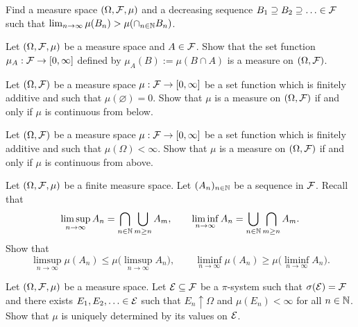 \begin{problem}
Find a measure space $(\Omega,\mathcal F,\mu)$ and a decreasing sequence $B_1\supseteq B_2\supseteq\ldots \in \mathcal F$ such that $\lim_{n\to\infty}\mu(B_n) > \mu(\cap_{n\in \mathbb N} B_n)$.    
\end{problem}

\begin{problem}
    Let $(\Omega,\mathcal F,\mu)$ be a measure space and $A\in \mathcal F$. Show that the set function $\mu_A:\mathcal F\to[0,\infty]$ defined by $\mu_A(B):=\mu(B\cap A)$ is a measure on $(\Omega,\mathcal F)$.  
\end{problem}

\begin{problem}
    Let $(\Omega,\mathcal F)$ be a measure space $\mu:\mathcal F\to[0,\infty]$ be a set function which is finitely additive and such that $\mu(\varnothing)=0$. Show that $\mu$ is a measure on $(\Omega,\mathcal F)$ if and only if $\mu$ is continuous from below. 
\end{problem}

\begin{problem}
    Let $(\Omega,\mathcal F)$ be a measure space $\mu:\mathcal F\to[0,\infty]$ be a set function which is finitely additive and such that $\mu(\Omega)<\infty$. Show that $\mu$ is a measure on $(\Omega,\mathcal F)$ if and only if $\mu$ is continuous from above. 
\end{problem}


\begin{problem}
    Let $(\Omega,\mathcal F,\mu)$ be a finite measure space. Let $(A_n)_{n\in \mathbb N}$ be a sequence in $\mathcal F$. Recall that 
    \begin{equation*}
        \limsup_{n\to\infty} A_n = \bigcap_{n\in \mathbb N} \bigcup_{m\geq n} A_m,\qquad \liminf_{n\to\infty} A_n = \bigcup_{n\in \mathbb N} \bigcap_{m\geq n} A_m.
    \end{equation*} 
    Show that
    \begin{equation*}
        \limsup_{n\to\infty} \mu(A_n) \leq  \mu \Big(\limsup_{n\to\infty} A_n\Big),\qquad \liminf_{n\to\infty} \mu(A_n) \geq  \mu \Big(\liminf_{n\to\infty} A_n\Big).
    \end{equation*}
\end{problem}

\begin{problem}
    Let $(\Omega,\mathcal F,\mu)$ be a measure space. Let $\mathcal E\subseteq \mathcal F$ be a $\pi$-system such that $\sigma(\mathcal E) = \mathcal F$ and there exists $E_1,E_2,\ldots \in \mathcal E$ such that $E_n\uparrow \Omega$ and $\mu(E_n)<\infty$ for all $n\in \mathbb N$. Show that $\mu$ is uniquely determined by its values on $\mathcal E$.
\end{problem}

